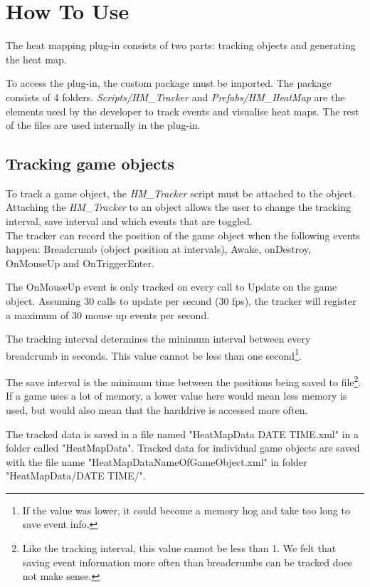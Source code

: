 \section{How To Use}
\label{HowToUse}
The heat mapping plug-in consists of two parts: tracking objects and generating the heat map.

To access the plug-in, the custom package must be imported. The package consists of 4 folders. \textit{Scripts/HM\_Tracker} and \textit{Prefabs/HM\_HeatMap} are the elements used by the developer to track events and visualise heat maps. The rest of the files are used internally in the plug-in.

\subsection{Tracking game objects}
\label{HowToUse_Tracking}
To track a game object, the \textit{HM\_Tracker} script must be attached to the object. Attaching the \textit{HM\_Tracker} to an object allows the user to change the tracking interval, save interval and which events that are toggled.
\\The tracker can record the position of the game object when the following events happen: Breadcrumb (object position at intervals), Awake, onDestroy, OnMouseUp and OnTriggerEnter.


The OnMouseUp event is only tracked on every call to Update on the game object. Assuming 30 calls to update per second (30 fps), the tracker will register a maximum of 30 mouse up events per second.

The tracking interval determines the minimum interval between every breadcrumb in seconds. This value cannot be less than one second\footnote{If the value was lower, it could become a memory hog and take too long to save event info.}.

The save interval is the minimum time between the positions being saved to file\footnote{Like the tracking interval, this value cannot be less than 1. We felt that saving event information more often than breadcrumbs can be tracked does not make sense.}. 
If a game uses a lot of memory, a lower value here would mean less memory is used, but would also mean that the harddrive is accessed more often.

The tracked data is saved in a file named "HeatMapData DATE TIME.xml" in a folder called "HeatMapData". Tracked data for individual game objects are saved with the file name "HeatMapDataNameOfGameObject.xml" in folder "HeatMapData/DATE TIME/".

